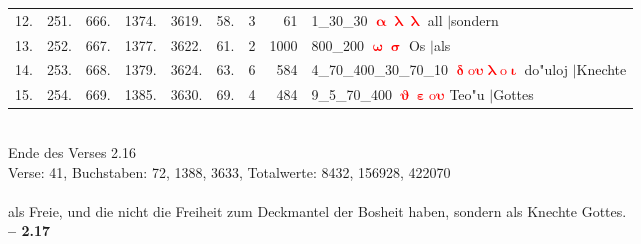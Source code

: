 \documentclass[a4paper,10pt,landscape]{article}
\begin{document}
\begin{tabular}{rrrrrrrrp{120mm}}
12.&251.&666.&1374.&3619.&58.&3&61&1\_30\_30 \textcolor{red}{$\boldsymbol{\upalpha\uplambda\uplambda}$} all $|$sondern\\
13.&252.&667.&1377.&3622.&61.&2&1000&800\_200 \textcolor{red}{$\boldsymbol{\upomega\upsigma}$} Os $|$als\\
14.&253.&668.&1379.&3624.&63.&6&584&4\_70\_400\_30\_70\_10 \textcolor{red}{$\boldsymbol{\updelta\mathrm{o}\upsilon\uplambda\mathrm{o}\upiota}$} do"uloj $|$Knechte\\
15.&254.&669.&1385.&3630.&69.&4&484&9\_5\_70\_400 \textcolor{red}{$\boldsymbol{\upvartheta\upepsilon\mathrm{o}\upsilon}$} Teo"u $|$Gottes\\
\end{tabular}\medskip \\
Ende des Verses 2.16\\
Verse: 41, Buchstaben: 72, 1388, 3633, Totalwerte: 8432, 156928, 422070\\
\\
als Freie, und die nicht die Freiheit zum Deckmantel der Bosheit haben, sondern als Knechte Gottes.\\
\newpage 
{\bf -- 2.17}\\
\medskip \\
\end{document}
